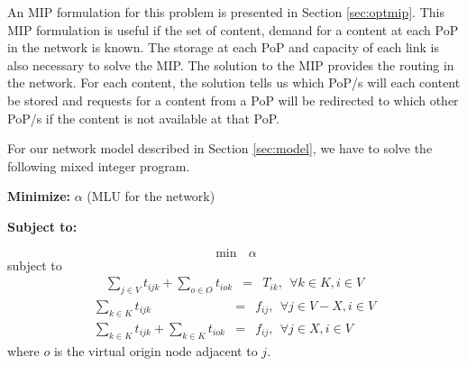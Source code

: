 {An MIP formulation for this problem is presented in Section \ref{sec:optmip}. This MIP formulation is useful if the set of content, demand for a content at each PoP in the network is known. The  storage at each PoP and capacity of each link is also necessary to solve the MIP. 
The solution to the MIP provides the routing in the network. For each content, the solution tells us which PoP/s will each content be stored and  requests for a content from a PoP will be redirected to which other PoP/s if the content is not available at that PoP.




\label{sec:optmip}



For our network model described in Section \ref{sec:model}, we have to solve the following mixed integer program.

\noindent\textbf{Minimize: } $\alpha$  (MLU for the network)

\noindent\textbf{Subject to:}

\begin{equation}\label{eq:flow1}
\mbox{$\min$ } \alpha
\end{equation}
subject to 
\begin{eqnarray}\label{eq:flow1}
 \sum_{j \in V }  t_{ijk} +  \sum_{o \in O}  t_{iok} &=& T_{ik}, \ \ \forall k \in K, i \in V
\end{eqnarray}
\begin{eqnarray}\label{eq:flow201}
\sum_{k \in K} t_{ijk} &=& f_{ij} , \ \ \forall j \in V - X, i \in V\\
\sum_{k \in K} t_{ijk} + \sum_{k \in K} t_{iok} &=& f_{ij} , \ \ \forall j \in X, i \in V
\end{eqnarray}
where $o$ is the virtual origin node adjacent to $j$.

}
